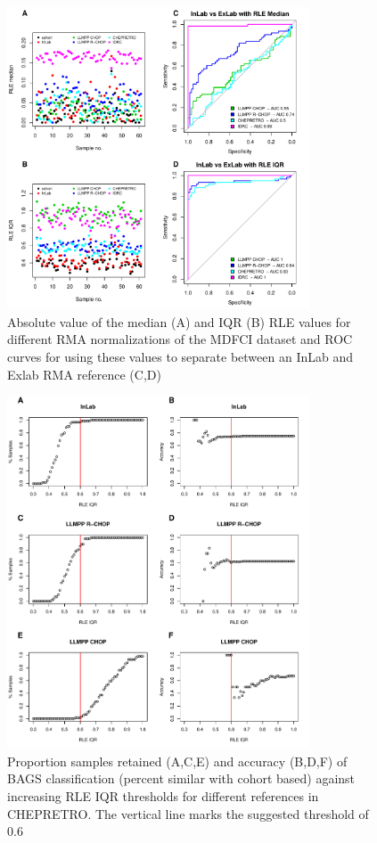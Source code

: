 \documentclass{article}
\begin{document}
\begin{figure}[!h]
	\begin{center}
			\includegraphics[width=0.8\textwidth]{figures/MDFCI_rle.pdf}
	\end{center}
	\caption{Absolute value of the median (A) and IQR (B) RLE values for different RMA normalizations of the MDFCI dataset and ROC curves for using these values to separate between an InLab and Exlab RMA reference (C,D)}
	\label{fig:mdfci_rle}
\end{figure}



\begin{figure}
	\begin{center}
		\includegraphics[width=0.8\textwidth]{figures/chep_rle_classification_bags.pdf}
	\end{center}
	\caption{Proportion samples retained (A,C,E) and accuracy (B,D,F) of BAGS classification (percent similar with cohort based) against increasing RLE IQR thresholds for different references in CHEPRETRO. The vertical line marks the suggested threshold of 0.6}
	\label{fig:chep_rle_clas_bags}
\end{figure}
\end{document}
